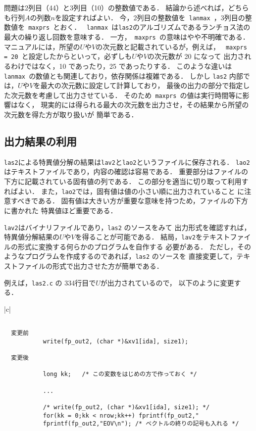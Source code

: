 問題は2列目（44）と3列目（10）の整数値である．
結論から述べれば，どちらも行列\( A \)の列数\( n \)を設定すればよい．
今，2列目の整数値を\verb| lanmax |，3列目の整数値を\verb| maxprs |とおく．
\verb| lanmax |は{\tt las2}のアルゴリズムであるランチョス法の最大の繰り返し回数を意味する．
一方，\verb| maxprs |の意味はやや不明確である．
マニュアルには，所望の\( U \)や\( V \)の次元数と記載されているが，例えば，
\verb| maxprs = 20 |と設定したからといって，必ずしも\( U \)や\( V \)の次元数が 20 になって
出力されるわけではなく，10 であったり，25 であったりする．
このような違いは\verb| lanmax |の数値とも関連しており，依存関係は複雑である．
しかし {\tt las2} 内部では，\( U \)や\( V \)を最大の次元数に設定して計算しており，
最後の出力の部分で指定した次元数を考慮して出力させている．
そのため\verb| maxprs |の値は実行時間等に影響はなく，
現実的には得られる最大の次元数を出力させ，その結果から所望の次元数を得た方が取り扱いが
簡単である．

\subsection{出力結果の利用}

{\tt las2}による特異値分解の結果は{\tt lav2}と{\tt lao2}というファイルに保存される．
{\tt lao2}はテキストファイルであり，内容の確認は容易である．
重要部分はファイルの下方に記載されている固有値の列である．
この部分を適当に切り取って利用すればよい．
また，{\tt lao2}では，固有値は値の小さい順に出力されていること
に注意すべきである．
固有値は大きい方が重要な意味を持つため，ファイルの下方に書かれた
特異値ほど重要である．

{\tt lav2}はバイナリファイルであり，{\tt las2} のソースをみて
出力形式を確認すれば，特異値分解結果の\( U \)や\( V \)を得ることが可能である．
結局，{\tt lav2}をテキストファイルの形式に変換する何らかのプログラムを自作する
必要がある．
ただし，そのようなプログラムを作成するのであれば，{\tt las2} のソースを
直接変更して，テキストファイルの形式で出力させた方が簡単である．

例えば，{\tt las2.c} の 334行目で\( U \)が出力されているので，
以下のように変更する．

\bigskip

\small
\begin{tabular}{|c|} \hline
\begin{minipage}[H]{134mm}
\begin{verbatim}

  変更前
           write(fp_out2, (char *)&xv1[ida], size1);

  変更後

           long kk;   /* この変数をはじめの方で作っておく */

           ...
          
           /* write(fp_out2, (char *)&xv1[ida], size1); */
           for(kk = 0;kk < nrow;kk++) fprintf(fp_out2,"
           fprintf(fp_out2,"EOV\n"); /* ベクトルの終りの記号も入れる */

\end{verbatim}
\end{minipage}
\\
\hline
\end{tabular}
\normalsize

